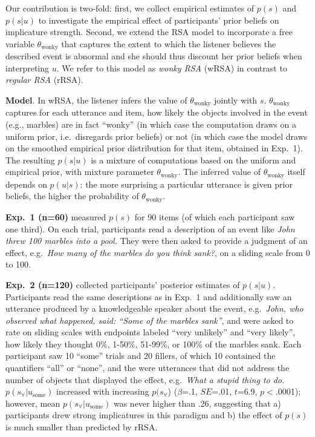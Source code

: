 \documentclass[11pt]{article}
\begin{document}
Our contribution is two-fold: first, we collect empirical estimates of $p(s)$ and $p(s|u)$ to investigate the empirical effect of participants' prior beliefs on implicature strength. Second, we extend the RSA model to incorporate a free variable $\theta_{\textrm{wonky}}$ that captures the extent to which the listener believes the described event is abnormal and she should thus discount her prior beliefs when interpreting $u$. We refer to this model as \textit{wonky RSA} (wRSA) in contrast to \textit{regular RSA} (rRSA). 

\textbf{Model}. In wRSA, the listener infers the value of $\theta_{\textrm{wonky}}$ jointly with $s$. $\theta_{\textrm{wonky}}$ captures for each utterance and item, how likely the objects involved in the event (e.g., marbles) are in fact ``wonky'' (in which case the computation draws on a uniform prior, i.e.~disregards prior beliefs) or not (in which case the model draws on the smoothed empirical prior distribution for that item, obtained in Exp.~1). The resulting $p(s|u)$ is a mixture of computations based on the uniform and empirical prior, with mixture parameter $\theta_{\textrm{wonky}}$. The inferred value of $\theta_{\textrm{wonky}}$ itself depends on $p(u|s)$: the more surprising a particular utterance is given prior beliefs, the higher the probability of $\theta_{\textrm{wonky}}$.

\textbf{Exp.~1 (n=60)} measured $p(s)$ %
for 90 items (of which each participant saw one third). On each trial, participants read a description of an event like \textit{John threw 100 marbles into a pool.} They were then asked to provide a judgment of an effect, e.g.~\textit{How many of the marbles do you think sank?}, on a sliding scale from 0 to 100.

\textbf{Exp.~2 (n=120)} collected participants' posterior estimates of $p(s|u)$. Participants read the same descriptions as in Exp.~1 and additionally saw an utterance produced by a knowledgeable speaker about the event, e.g.~\textit{John, who observed what happened, said: ``Some of the marbles sank''}, and were asked to rate on sliding scales with endpoints labeled ``very unlikely'' and ``very likely'', how likely they thought 0\%, 1-50\%, 51-99\%, or 100\% of the marbles sank. Each participant saw 10 ``some'' trials and 20 fillers, of which 10 contained the quantifiers ``all'' or ``none'', and the were utterances that did not address the number of objects that displayed the effect, e.g.~\textit{What a stupid thing to do.} $p(s_{\forall}|u_{\textrm{some}})$ increased with increasing $p(s_{\forall}$) ($\beta$=.1, $SE$=.01, $t$=6.9, $p$$<$.0001); however, mean $p(s_{\forall}|u_{\textrm{some}})$ was never higher than .26, suggesting that a) participants drew strong implicatures in this paradigm and b) the effect of $p(s)$ is much smaller than predicted by rRSA.
\end{document}
